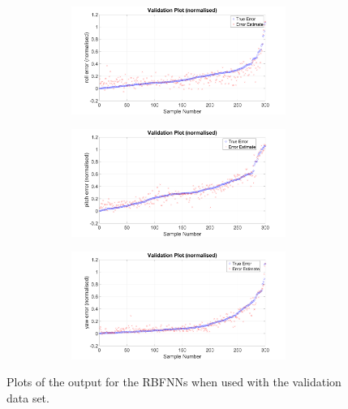\begin{figure}
\begin{subfigure}{0.48\textwidth}
\begin{subfigure}{\textwidth}
    \end{subfigure}
    \caption{}
  \end{subfigure}
  \begin{subfigure}{0.48\textwidth}
    \begin{subfigure}{\textwidth}
      \includegraphics[clip, trim = 80 0 100 0, width=\textwidth]{figures/chapter4/v_roll}
    \end{subfigure}
    \begin{subfigure}{\textwidth}
      \includegraphics[clip, trim = 80 0 100 0, width=\textwidth]{figures/chapter4/v_pitch}
    \end{subfigure}
    \begin{subfigure}{\textwidth}
      \includegraphics[clip, trim = 80 0 100 0, width=\textwidth]{figures/chapter4/v_yaw}
    \end{subfigure}
    \caption{}
  \end{subfigure}
  \caption[Output of the RBFNNs with the validation set input.]{Plots of the output for the RBFNNs when used with the validation data set.}
  \label{fig:chap4-rbf-valid}
\end{figure}

